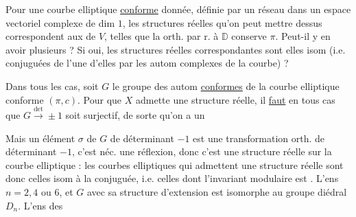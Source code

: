 
Pour une courbe elliptique \uline{conforme} donnée, définie par un réseau \inserted{$\pi$} dans un espace vectoriel complexe  de dim $1$, les structures réelles qu'on peut mettre dessus correspondent aux   de $V$, telles que la   orth. par r. à $\mathbb D$ conserve $\pi$. Peut-il y en avoir plusieurs ? Si oui, les structures réelles correspondantes sont elles isom (i.e. conjuguées de l'une d'elles par les autom complexes de la courbe) ?

 

Dans tous les cas, soit $G$ le groupe des autom \uline{conformes} de la courbe elliptique conforme  $(\pi,c)$. Pour que  $X$ admette une structure réelle, il \uline{faut} en tous cas que $G\xrightarrow{\det}\pm1$ soit surjectif, de sorte qu'on a un


Mais un élément $\sigma$ de $G$ de déterminant $-1$ est une transformation orth. de déterminant $-1$, c'est néc. une réflexion, donc c'est une structure réelle sur la courbe elliptique : les courbes elliptiques qui admettent une structure réelle sont donc celles isom à la conjuguée, i.e. celles dont l'invariant modulaire est . L'ens      $n=2,4$ ou $6$, et $G$  avec sa structure d'extension est isomorphe au groupe diédral $D_n$. L'ens des
